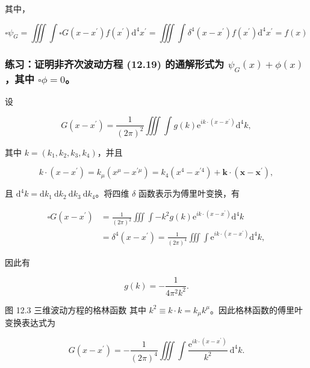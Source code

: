其中，

\[▫\psi_{G} = \iiint\int ▫G\left( x - x^{\prime} \right)f\left( x^{\prime} \right)\mathrm{d}^{4}x^{\prime} = \iiint\int\delta^{4}\left( x - x^{\prime} \right)f\left( x^{\prime} \right)\mathrm{d}^{4}x^{\prime} = f(x)\]

\subsubsection{\texorpdfstring{练习：证明非齐次波动方程 (12.19)
的通解形式为 \(\psi_{G}(x) + \phi(x)\)，其中
\(▫\phi = 0\)。}{练习：证明非齐次波动方程 (12.19) 的通解形式为 \textbackslash psi\_\{G\}(x) + \textbackslash phi(x)，其中 ▫\textbackslash phi = 0。}}\label{ux7ec3ux4e60ux8bc1ux660eux975eux9f50ux6b21ux6ce2ux52a8ux65b9ux7a0b-12.19-ux7684ux901aux89e3ux5f62ux5f0fux4e3a-psi_gxphixux5176ux4e2d-square-phi0}

设

\[G\left( x - x^{\prime} \right) = \frac{1}{(2\pi)^{2}}\iiint\int g(k)\mathrm{e}^{ik \cdot \left( x - x^{\prime} \right)}\mathrm{d}^{4}k,\]

其中 \(k = \left( k_{1},k_{2},k_{3},k_{4} \right)\)，并且

\[k \cdot \left( x - x^{\prime} \right) = k_{\mu}\left( x^{\mu} - x^{\prime\mu} \right) = k_{4}\left( x^{4} - x^{\prime 4} \right) + \mathbf{k} \cdot \left( \mathbf{x} - \mathbf{x}^{\prime} \right),\]

且
\(\mathrm{d}^{4}k = \mathrm{d}k_{1}\mathrm{\: d}k_{2}\mathrm{\: d}k_{3}\mathrm{\: d}k_{4}\)。将四维
\(\delta\) 函数表示为傅里叶变换，有

\[\begin{aligned}
▫G\left( x - x^{\prime} \right) & = \frac{1}{(2\pi)^{2}}\iiint\int - k^{2}g(k)\mathrm{e}^{ik \cdot \left( x - x^{\prime} \right)}\mathrm{d}^{4}k \\
 & = \delta^{4}\left( x - x^{\prime} \right) = \frac{1}{(2\pi)^{4}}\iiint\int\mathrm{e}^{ik \cdot \left( x - x^{\prime} \right)}\mathrm{d}^{4}k,
\end{aligned}\]

因此有

\[g(k) = - \frac{1}{4\pi^{2}k^{2}}.\]

图 12.3 三维波动方程的格林函数
\label{ux56fe-12.3-ux4e09ux7ef4ux6ce2ux52a8ux65b9ux7a0bux7684ux683cux6797ux51fdux6570}{}
其中
\(k^{2} \equiv k \cdot k = k_{\mu}k^{\mu}\)。因此格林函数的傅里叶变换表达式为

\[G\left( x - x^{\prime} \right) = - \frac{1}{(2\pi)^{4}}\iiint\int\frac{\mathrm{e}^{ik \cdot \left( x - x^{\prime} \right)}}{k^{2}}\mathrm{\: d}^{4}k.\]


